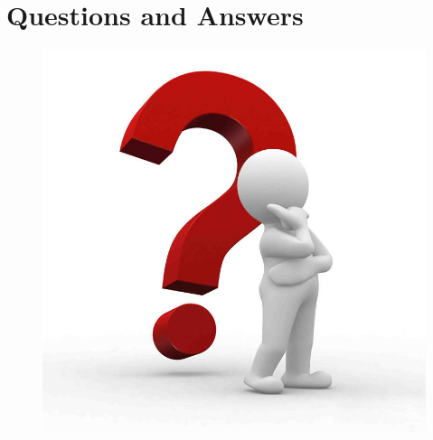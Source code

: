 ﻿\documentclass{beamer}
\begin{document}
\part[Questions and Answers]{Questions and Answers}
\begin{frame}
\begin{figure}
  \centering
  \includegraphics[width=.4\textwidth]{picturedir/QA2.jpg}
\end{figure}
\end{frame}
\end{document}
